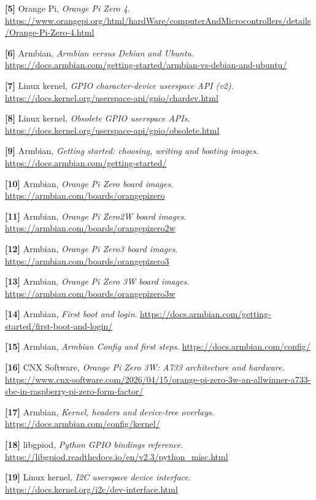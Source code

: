 \documentclass[10pt,oneside,openany]{report}
\begin{document}
\noindent\textbf{[5]} Orange Pi, \emph{Orange Pi Zero 4}. \url{https://www.orangepi.org/html/hardWare/computerAndMicrocontrollers/details/Orange-Pi-Zero-4.html}

\noindent\textbf{[6]} Armbian, \emph{Armbian versus Debian and Ubuntu}. \url{https://docs.armbian.com/getting-started/armbian-vs-debian-and-ubuntu/}

\noindent\textbf{[7]} Linux kernel, \emph{GPIO character-device userspace API (v2)}. \url{https://docs.kernel.org/userspace-api/gpio/chardev.html}

\noindent\textbf{[8]} Linux kernel, \emph{Obsolete GPIO userspace APIs}. \url{https://docs.kernel.org/userspace-api/gpio/obsolete.html}

\noindent\textbf{[9]} Armbian, \emph{Getting started: choosing, writing and booting images}. \url{https://docs.armbian.com/getting-started/}

\noindent\textbf{[10]} Armbian, \emph{Orange Pi Zero board images}. \url{https://armbian.com/boards/orangepizero}

\noindent\textbf{[11]} Armbian, \emph{Orange Pi Zero2W board images}. \url{https://armbian.com/boards/orangepizero2w}

\noindent\textbf{[12]} Armbian, \emph{Orange Pi Zero3 board images}. \url{https://armbian.com/boards/orangepizero3}

\noindent\textbf{[13]} Armbian, \emph{Orange Pi Zero 3W board images}. \url{https://armbian.com/boards/orangepizero3w}

\noindent\textbf{[14]} Armbian, \emph{First boot and login}. \url{https://docs.armbian.com/getting-started/first-boot-and-login/}

\noindent\textbf{[15]} Armbian, \emph{Armbian Config and first steps}. \url{https://docs.armbian.com/config/}

\noindent\textbf{[16]} CNX Software, \emph{Orange Pi Zero 3W: A733 architecture and hardware}. \url{https://www.cnx-software.com/2026/04/15/orange-pi-zero-3w-an-allwinner-a733-sbc-in-raspberry-pi-zero-form-factor/}

\noindent\textbf{[17]} Armbian, \emph{Kernel, headers and device-tree overlays}. \url{https://docs.armbian.com/config/kernel/}

\noindent\textbf{[18]} libgpiod, \emph{Python GPIO bindings reference}. \url{https://libgpiod.readthedocs.io/en/v2.3/python_misc.html}

\noindent\textbf{[19]} Linux kernel, \emph{I2C userspace device interface}. \url{https://docs.kernel.org/i2c/dev-interface.html}
\end{document}
